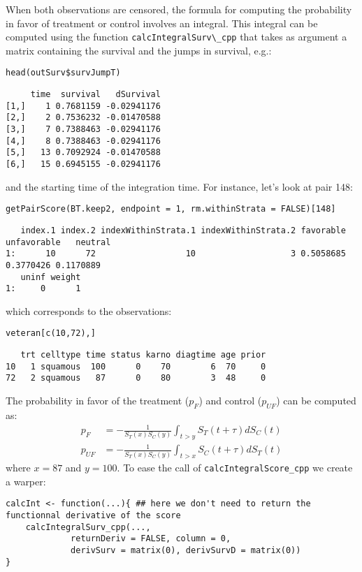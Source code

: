 \documentclass[12pt]{article}
\begin{document}
When both observations are censored, the formula for computing the
probability in favor of treatment or control involves an
integral. This integral can be computed using the function
\texttt{calcIntegralSurv\textbackslash{}\_cpp} that takes as argument a matrix containing the
survival and the jumps in survival, e.g.:
\lstset{language=r,label= ,caption= ,captionpos=b,numbers=none}
\begin{lstlisting}
head(outSurv$survJumpT)
\end{lstlisting}

\begin{verbatim}
     time  survival   dSurvival
[1,]    1 0.7681159 -0.02941176
[2,]    2 0.7536232 -0.01470588
[3,]    7 0.7388463 -0.02941176
[4,]    8 0.7388463 -0.02941176
[5,]   13 0.7092924 -0.01470588
[6,]   15 0.6945155 -0.02941176
\end{verbatim}

and the starting time of the integration time. For instance, let's
look at pair 148:
\lstset{language=r,label= ,caption= ,captionpos=b,numbers=none}
\begin{lstlisting}
getPairScore(BT.keep2, endpoint = 1, rm.withinStrata = FALSE)[148]
\end{lstlisting}

\begin{verbatim}
   index.1 index.2 indexWithinStrata.1 indexWithinStrata.2 favorable unfavorable   neutral
1:      10      72                  10                   3 0.5058685   0.3770426 0.1170889
   uninf weight
1:     0      1
\end{verbatim}

which corresponds to the observations:
\lstset{language=r,label= ,caption= ,captionpos=b,numbers=none}
\begin{lstlisting}
veteran[c(10,72),]
\end{lstlisting}

\begin{verbatim}
   trt celltype time status karno diagtime age prior
10   1 squamous  100      0    70        6  70     0
72   2 squamous   87      0    80        3  48     0
\end{verbatim}

The probability in favor of the treatment (\(p_F\)) and control (\(p_{UF}\)) can be computed
as:
\begin{align*}
p_F &= -\frac{1}{S_T(x)S_C(y)}\int_{t>y} S_T(t+\tau) dS_C(t) \\
p_{UF} &= -\frac{1}{S_T(x)S_C(y)}\int_{t>x} S_C(t+\tau) dS_T(t)
\end{align*}
where \(x=87\) and \(y=100\). To ease the call of \texttt{calcIntegralScore\_cpp} we create a warper:
\lstset{language=r,label= ,caption= ,captionpos=b,numbers=none}
\begin{lstlisting}
calcInt <- function(...){ ## here we don't need to return the functionnal derivative of the score 
    calcIntegralSurv_cpp(..., 
			 returnDeriv = FALSE, column = 0,
			 derivSurv = matrix(0), derivSurvD = matrix(0))
}
\end{lstlisting}
\end{document}
